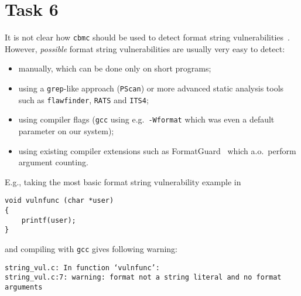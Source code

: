 \section*{Task 6}
It is not clear how \texttt{cbmc} should be used to detect format string vulnerabilities~\cite{lhee,Younan04codeinjection}.  However, \emph{possible} format string vulnerabilities are usually very easy to detect: 
\begin{itemize}
 \item manually, which can be done only on short programs;
 \item using a \texttt{grep}-like approach (\texttt{PScan}) or more advanced static analysis tools such as \texttt{flawfinder}, \texttt{RATS} and \texttt{ITS4};
 \item using compiler flags (\texttt{gcc} using e.g.~\texttt{-Wformat} which was even a default parameter on our system);
 \item using existing compiler extensions such as FormatGuard~\cite{formatguard} which a.o.~perform argument counting.
\end{itemize}

E.g., taking the most basic format string vulnerability example in~\cite{lhee}
\begin{lstlisting}
void vulnfunc (char *user)
{
    printf(user);
}
\end{lstlisting}
and compiling with \texttt{gcc} gives following warning:
\begin{Verbatim}[fontsize=\footnotesize]
string_vul.c: In function ‘vulnfunc’:
string_vul.c:7: warning: format not a string literal and no format arguments
\end{Verbatim}